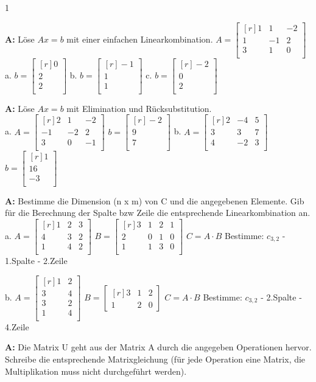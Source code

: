 \documentclass[landscape,twocolumn,a4paper]{article}
\newcommand{\matrixdd}[9]{\ensuremath{\begin{bmatrix*}[r] #1 & #2 & #3 \\  #4 & #5 & #6\\ #7 & #8 & #9 \\ \end{bmatrix*}}}
\newcommand{\vectord}[3]{\ensuremath{\begin{bmatrix*}[r] #1 \\#2 \\#3 \\ \end{bmatrix*}}}
\begin{document}
\setcounter {y} {1}
\parindent 0mm
\bigskip
 
\textbf{A:}   
Löse $Ax = b$ mit einer einfachen Linearkombination.
$A =\matrixdd{1}{1}{-2}{1}{-1}{2}{3}{1}{0}$\\

a.  $b = \vectord{0}{2}{2}$ \quad b. $b = \vectord{-1}{1}{1}$ \quad c. $ b = \vectord{-2}{0}{2}$ 
\bigskip {}

\textbf{A:}   
Löse $Ax = b$ mit Elimination und Rücksubstitution. \\

a.  $A =\matrixdd{2}{1}{-2}{-1}{-2}{2}{3}{0}{-1}$ \quad $b = \vectord{-2}{9}{7}$  \quad
b.  $A =\matrixdd{2}{-4}{5}{3}{3}{7}{4}{-2}{3}$ \quad $b = \vectord{1}{16}{-3}$ 
\bigskip {}

\textbf{A:}   
Bestimme die Dimension (n x m) von C und die angegebenen Elemente. Gib für die
Berechnung der Spalte bzw Zeile die entsprechende Linearkombination an.\\
 
a.
$A =\matrixdd{1}{2}{3}{4}{3}{2}{1}{4}{2}$  \quad
 $B =\begin{bmatrix*}[r] 3 & 1 & 2 & 1\\  2 & 0 & 1 & 0\\ 1 & 1 & 3 & 0\\ \end{bmatrix*}$  \quad
 $C = A \cdot B$  \quad Bestimme: 
 $c_{3,2}$ - 1.Spalte - 2.Zeile
 \vspace{10pt}
 
 b.
$A =\begin{bmatrix*}[r] 1 & 2\\  3 & 4 \\  3 & 2\\ 1 & 4 \\ \end{bmatrix*}$  \quad
 $B =\begin{bmatrix*}[r] 3 & 1 & 2 \\  1 & 2 &  0 \end{bmatrix*}$  \quad
 $C = A \cdot B$  \quad Bestimme: 
 $c_{3,2}$ - 2.Spalte - 4.Zeile

\bigskip {}

\textbf{A:}   
Die Matrix U geht aus der Matrix A durch die angegeben Operationen hervor.
Schreibe die entsprechende Matrixgleichung (für jede Operation eine Matrix, die Multiplikation muss nicht
durchgeführt werden). \\
\end{document}
